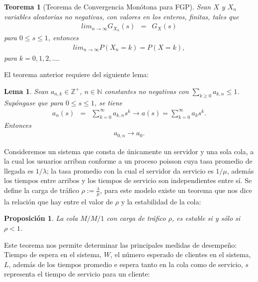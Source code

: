 \documentclass{article}
\newtheorem{Teo}{Teorema}[section]
\newtheorem{Prop}{Proposición}[section]
\newtheorem{Lemma}{Lema}[section]
\newcommand{\nat}{\mathbb{N}}
\newcommand{\ent}{\mathbb{Z}}
\numberwithin{equation}{section}
\begin{document}
\begin{Teo}[Teorema de Convergencia Mon\'otona para FGP] Sean $X$ y $X_{n}$ variables aleatorias no negativas, con valores en los enteros, finitas, tales que
\begin{eqnarray*}
lim_{n\rightarrow\infty}G_{X_{n}}\left(s\right)&=&G_{X}\left(s\right)
\end{eqnarray*}
para $0\leq s\leq1$, entonces
\begin{eqnarray*}
lim_{n\rightarrow\infty}P\left(X_{n}=k\right)=P\left(X=k\right),
\end{eqnarray*}
para $k=0,1,2,\ldots.$
\end{Teo}

El teorema anterior requiere del siguiente lema:
\begin{Lemma}
Sean $a_{n,k}\in\ent^{+}$, $n\in\nat$ constantes no negativas con
$\sum_{k\geq0}a_{k,n}\leq1$. Sup\'ongase que para $0\leq s\leq1$,
se tiene
\begin{eqnarray}
a_{n}\left(s\right)&=&\sum_{k=0}^{\infty}a_{k,n}s^{k}\rightarrow
a\left(s\right)=\sum_{k=0}^{\infty}a_{k}s^{k}.
\end{eqnarray}
Entonces
\begin{eqnarray}
a_{0,n}\rightarrow a_{0}.
\end{eqnarray}
\end{Lemma}

Consideremos un sistema que consta de \'unicamente un servidor y una sola cola, a la cual los usuarios arriban conforme a un proceso poisson cuya tasa promedio de llegada es $1/\lambda$; la tasa promedio con la cual el servidor da servicio es $1/\mu$, adem\'as los tiempos entre arribos y los tiempos de servicio son independientes entre s\'i. Se define la carga de tr\'afico $\rho:=\frac{\lambda}{\mu}$, para este modelo existe un teorema que nos dice la relaci\'on que hay entre el valor de $\rho$ y la estabilidad de la cola:

\begin{Prop}
La cola $M/M/1$ con carga de tr\'afico $\rho$, es estable si y s\'olo si $\rho<1$.
\end{Prop}

Este teorema nos permite determinar las principales medidas de desempe\~no: Tiempo de espera en el sistema, $W$, el n\'umero esperado de clientes en el sistema, $L$, adem\'as de los tiempos promedio e espera tanto en la cola como de servicio, $s$ representa el tiempo de servicio para un cliente:
\end{document}
